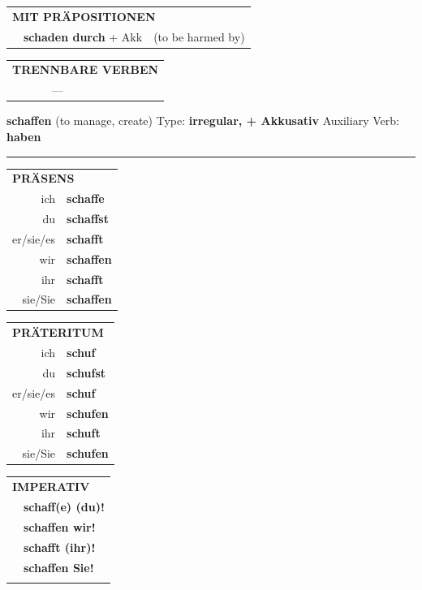 \documentclass[10pt,a4paper]{revtex4-2}
\begin{document}
\begin{verbbox}
\vspace{10pt}

\begin{tabular}{lll}
\multicolumn{3}{l}{\textbf{MIT PRÄPOSITIONEN}}\\
& \textbf{schaden durch} + Akk & (to be harmed by)\\
\end{tabular}
\hfill
\begin{tabular}{lll}
\multicolumn{3}{l}{\textbf{TRENNBARE VERBEN}}\\
& ---\\
\end{tabular}
\vspace{-5pt}
\end{verbbox}

\begin{verbbox-acc}
    {\Large \bf schaffen} (to manage, create) \hfill Type: \textbf{irregular, + Akkusativ} \hfill Auxiliary Verb: \textbf{haben} 
    
     \vspace{5pt}

    \hrule
    
    \vspace{5pt}

  \begin{tabular}{rl}
     \multicolumn{2}{l}{\textbf{PRÄSENS} }\\
    ich & \textbf{schaffe}\\
    du & \textbf{schaffst}\\
    er/sie/es & \textbf{schafft}\\
    wir & \textbf{schaffen}\\
    ihr & \textbf{schafft}\\
    sie/Sie & \textbf{schaffen}\\
  \end{tabular}
  \hfill
     \begin{tabular}{rl}
    \multicolumn{2}{l}{\textbf{PRÄTERITUM} }\\
    ich & \textbf{schuf}\\
    du & \textbf{schufst}\\
    er/sie/es & \textbf{schuf}\\
    wir & \textbf{schufen}\\
    ihr & \textbf{schuft}\\
    sie/Sie & \textbf{schufen}\\
  \end{tabular}
  \hfill
  \begin{tabular}{rl}
     \multicolumn{2}{l}{\textbf{IMPERATIV} }\\
   & \textbf{schaff(e) (du)!}\\
   & \textbf{schaffen wir!}\\
   & \textbf{schafft (ihr)!}\\
   & \textbf{schaffen Sie!}\\
   & \vspace{10pt}
  \end{tabular}


\end{verbbox-acc}
\end{document}

